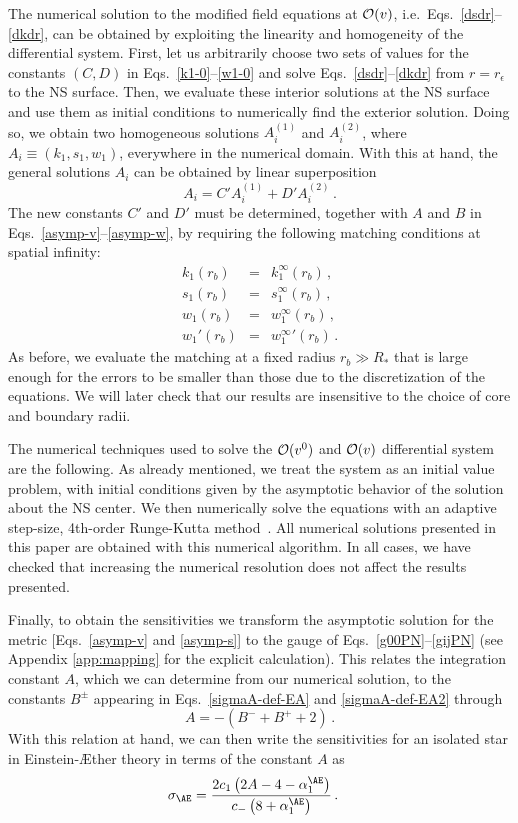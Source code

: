 \documentclass[prd,aps,twocolumn,nofootinbib,showpacs,superscriptaddress]{revtex4-1}
\newcommand\be{\begin{equation}}
\newcommand\ba{\begin{eqnarray}}
\newcommand\ee{\end{equation}}
\newcommand\ea{\end{eqnarray}}
\begin{document}
The numerical solution to the modified field equations at
${\cal{O}}(v)$, i.e.~Eqs.~\eqref{dsdr}--\eqref{dkdr}, can be obtained
by exploiting the linearity and homogeneity of the differential
system. First, let us arbitrarily choose two sets of values for the constants
$(C,D)$ in Eqs.~\eqref{k1-0}--\eqref{w1-0} and solve
Eqs.~\eqref{dsdr}--\eqref{dkdr} from $r=r_\epsilon$ to the NS
surface. Then, we evaluate these interior solutions at the NS surface
and use them as initial conditions to numerically find the exterior
solution. Doing so, we obtain two homogeneous solutions $A_i^{(1)}$
and $A_i^{(2)}$, where $A_i \equiv (k_1,s_1,w_1)$, everywhere in the
numerical domain. With this at hand, the general solutions $A_i$  can
be obtained by linear superposition
%
\be A_i = C' A_i^{(1)} + D' A_i^{(2)}\,.  
\label{general-sol}
\ee
%
The new constants $C'$ and $D'$ must be determined, together with $A$
and $B$ in Eqs.~\eqref{asymp-v}--\eqref{asymp-w}, by requiring the
following matching conditions at spatial infinity:
%
\ba k_1 (r_b) &=& k_1^\infty (r_b)\,, \\ s_1 (r_b) &=& s_1^\infty
(r_b)\,, \\ w_1 (r_b) &=& w_1^\infty (r_b)\,, \\ w_1' (r_b) &=&
w_1^\infty{}' (r_b)\,.  \ea As before, we evaluate the matching at a
fixed radius $r_{b} \gg R_*$ that is large enough for the errors to be
 smaller than those due to the discretization of the
equations. We will later check that our results are insensitive to the
choice of core and boundary radii. 

The numerical techniques used to solve the ${\cal{O}}(v^0)$ and
${\cal{O}}(v)$ differential system are the following. As already
mentioned, we treat the system as an initial value problem, with
initial conditions given by the asymptotic behavior of the solution
about the NS center. We then numerically
solve the equations with an adaptive step-size, 4th-order Runge-Kutta
method~\cite{gsl}. All numerical solutions presented in this paper
are obtained with this numerical algorithm. In all cases, we have
checked that increasing the numerical resolution does not affect the
results presented.  

Finally, to obtain the sensitivities we transform the asymptotic solution for the metric [Eqs.~\eqref{asymp-v} and \eqref{asymp-s}]
to the gauge of Eqs.~\eqref{g00PN}--\eqref{gijPN} (see Appendix \ref{app:mapping} for the explicit calculation). This relates the integration
constant $A$, which we can determine from our numerical solution, to the constants $B^{\pm}$ appearing in Eqs.~\eqref{sigmaA-def-EA} and \eqref{sigmaA-def-EA2} through
\be A = -(B^{-} + B^{+}+2)\,.
\label{Eq:A-text}
\ee
With this relation at hand, we can then write the sensitivities for an isolated star in Einstein-\AE ther theory in terms of the constant $A$ as 
%
\begin{align}
\sigma_{\AE} &= \frac{2 c_{1} \left(2 A - 4 - \alpha_{1}^{\AE}\right)}{c_{-} \left(8 + \alpha_{1}^{\AE}\right)}\,.
\end{align}
%
\end{document}
